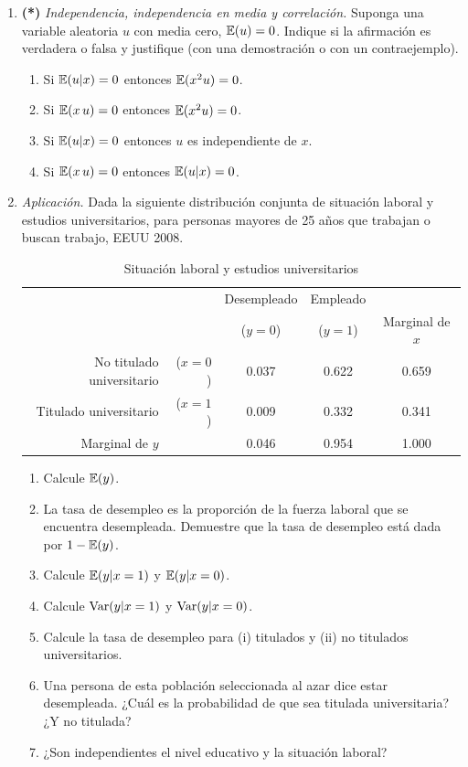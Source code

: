 \documentclass[letterpaper,11pt]{article}
\begin{document}
\begin{enumerate}[itemsep=1.2em]
\item \textbf{(*)} \emph{Independencia, independencia en media y correlación.} Suponga una variable
    aleatoria $u$ con media cero, $\operatorname{\mathbb{E}}(u)=0$. Indique si la afirmación es verdadera o falsa y
    justifique (con una demostración o con un contraejemplo).
    \begin{enumerate}
        \item Si $\operatorname{\mathbb{E}}(u|x)=0$ entonces $\operatorname{\mathbb{E}}(x^2u)=0$.
        \item Si $\operatorname{\mathbb{E}}(x\,u)=0$ entonces $\operatorname{\mathbb{E}}(x^2u)=0$.
        \item Si $\operatorname{\mathbb{E}}(u|x)=0$ entonces $u$ es independiente de $x$.
        \item Si $\operatorname{\mathbb{E}}(x\,u)=0$ entonces $\operatorname{\mathbb{E}}(u|x)=0$.
    \end{enumerate}

\item \emph{Aplicación.} Dada la siguiente distribución conjunta de situación laboral y
    estudios universitarios, para personas mayores de 25 años que trabajan o buscan trabajo,
    EEUU 2008.
    \begin{table}[!htbp]
        \centering
        \caption{Situación laboral y estudios universitarios}
        \begin{tabular}{rrccc}
            \toprule
            & & Desempleado & Empleado & \\
            & & ($y=0$) & ($y=1$) & Marginal de $x$ \\
            \midrule
            No titulado universitario & ($x=0$) & 0.037 & 0.622 & 0.659 \\
            Titulado universitario    & ($x=1$) & 0.009 & 0.332 & 0.341 \\
            \midrule
            Marginal de $y$ & & 0.046 & 0.954 & 1.000 \\
            \bottomrule
        \end{tabular}
    \end{table}
    \begin{enumerate}
        \item Calcule $\operatorname{\mathbb{E}}(y)$.
        \item La tasa de desempleo es la proporción de la fuerza laboral que se encuentra
              desempleada. Demuestre que la tasa de desempleo está dada por $1-\operatorname{\mathbb{E}}(y)$.
        \item Calcule $\operatorname{\mathbb{E}}(y|x=1)$ y $\operatorname{\mathbb{E}}(y|x=0)$.
        \item Calcule $\operatorname{Var}(y|x=1)$ y $\operatorname{Var}(y|x=0)$.
        \item Calcule la tasa de desempleo para (i) titulados y (ii) no titulados universitarios.
        \item Una persona de esta población seleccionada al azar dice estar desempleada.
              ¿Cuál es la probabilidad de que sea titulada universitaria? ¿Y no titulada?
        \item ¿Son independientes el nivel educativo y la situación laboral?
    \end{enumerate}


\end{enumerate}
\end{document}
